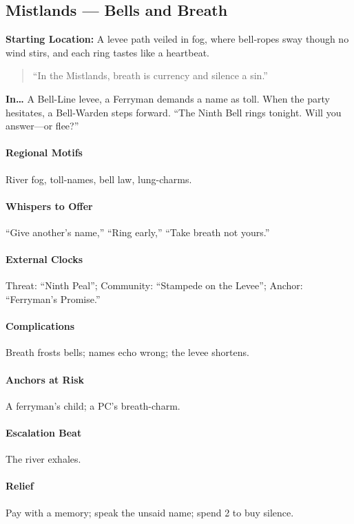 \subsection*{Mistlands — Bells and Breath}
\textbf{Starting Location:} A levee path veiled in fog, where bell‑ropes sway though no wind stirs, and each ring tastes like a heartbeat.
\begin{quote}
“In the Mistlands, breath is currency and silence a sin.”
\end{quote}

\textbf{In…} A Bell-Line levee, a Ferryman demands a name as toll. When the party hesitates, a Bell-Warden steps forward. ``The Ninth Bell rings tonight. Will you answer—or flee?''
\paragraph{Regional Motifs} River fog, toll-names, bell law, lung-charms.
\paragraph{Whispers to Offer} ``Give another’s name,'' ``Ring early,'' ``Take breath not yours.''
\paragraph{External Clocks} Threat: ``Ninth Peal''; Community: ``Stampede on the Levee''; Anchor: ``Ferryman’s Promise.''
\paragraph{Complications} Breath frosts bells; names echo wrong; the levee shortens.
\paragraph{Anchors at Risk} A ferryman’s child; a PC’s breath-charm.
\paragraph{Escalation Beat} The river exhales.
\paragraph{Relief} Pay with a memory; speak the unsaid name; spend 2 \Boons{} to buy silence.

